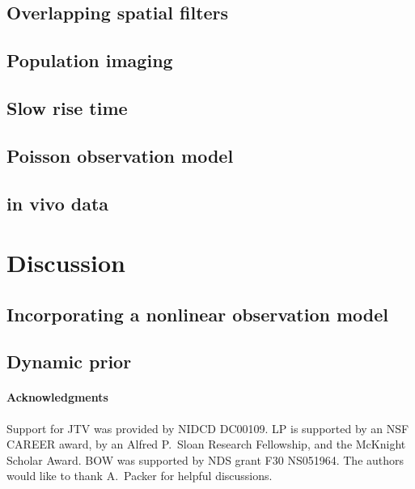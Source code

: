 \clearpage\newpage
\subsection{Overlapping spatial filters} \label{sec:overlap}


\clearpage\newpage
\subsection{Population imaging} \label{sec:pop}


\clearpage\newpage
\subsection{Slow rise time} \label{sec:slow}


\clearpage\newpage
\subsection{Poisson observation model} \label{sec:poisson}


\clearpage\newpage
\subsection{in vivo data} \label{sec:vivo}


\newpage
\section{Discussion} \label{sec:dis}


\clearpage\newpage
\subsection{Incorporating a nonlinear observation model} \label{sec:nonlin}


\clearpage\newpage
\subsection{Dynamic prior}



\paragraph{Acknowledgments}

Support for JTV was provided by NIDCD DC00109. LP is supported by an NSF CAREER award, by an Alfred P.\ Sloan Research Fellowship, and the McKnight Scholar Award. BOW was supported by NDS grant F30 NS051964. The authors would like to thank A.\ Packer for helpful discussions.

